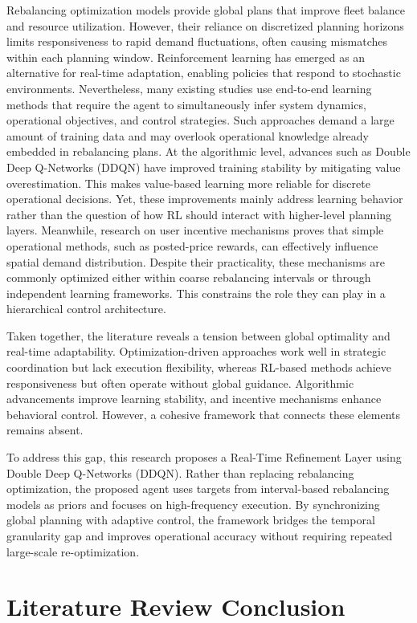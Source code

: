 Rebalancing optimization models provide global plans that improve fleet balance and resource utilization. However, their reliance on discretized planning horizons limits responsiveness to rapid demand fluctuations, often causing mismatches within each planning window. Reinforcement learning has emerged as an alternative for real-time adaptation, enabling policies that respond to stochastic environments. Nevertheless, many existing studies use end-to-end learning methods that require the agent to simultaneously infer system dynamics, operational objectives, and control strategies. Such approaches demand a large amount of training data and may overlook operational knowledge already embedded in rebalancing plans. At the algorithmic level, advances such as Double Deep Q-Networks (DDQN) have improved training stability by mitigating value overestimation. This makes value-based learning more reliable for discrete operational decisions. Yet, these improvements mainly address learning behavior rather than the question of how RL should interact with higher-level planning layers. Meanwhile, research on user incentive mechanisms proves that simple operational methods, such as posted-price rewards, can effectively influence spatial demand distribution. Despite their practicality, these mechanisms are commonly optimized either within coarse rebalancing intervals or through independent learning frameworks. This constrains the role they can play in a hierarchical control architecture.

Taken together, the literature reveals a tension between global optimality and real-time adaptability. Optimization-driven approaches work well in strategic coordination but lack execution flexibility, whereas RL-based methods achieve responsiveness but often operate without global guidance. Algorithmic advancements improve learning stability, and incentive mechanisms enhance behavioral control. However, a cohesive framework that connects these elements remains absent.

To address this gap, this research proposes a Real-Time Refinement Layer using Double Deep Q-Networks (DDQN). Rather than replacing rebalancing optimization, the proposed agent uses targets from interval-based rebalancing models as priors and focuses on high-frequency execution. By synchronizing global planning with adaptive control, the framework bridges the temporal granularity gap and improves operational accuracy without requiring repeated large-scale re-optimization.

\section{Literature Review Conclusion}


